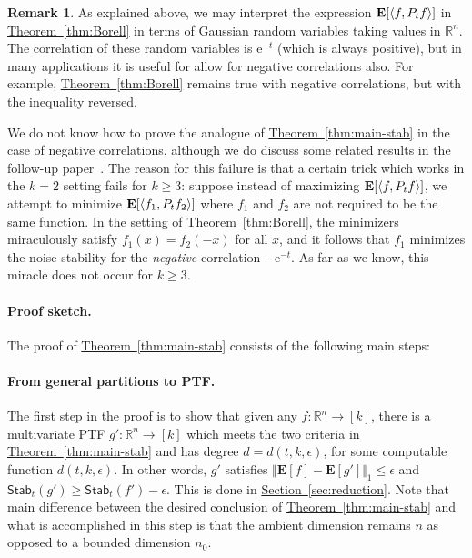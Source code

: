 \documentclass[11pt]{article}
\numberwithin{equation}{section}
\theoremstyle{definition}
\newtheorem{remark}[theorem]{Remark}
\theoremstyle{plain}
\newcommand{\R}{\mathbb R}
\newcommand{\eee}{\mathrm e}
\newcommand{\expref}[2]{\hyperref[#2]{#1~\ref{#2}}}
\newcommand{\E}{{\bf E}}
\begin{document}
\begin{remark}
    As explained above, we may interpret the expression $\E[\langle f, P_t f
      \rangle]$
in  %
    \expref{Theorem}{thm:Borell} in terms of Gaussian random variables
    taking values in $\R^n$. The correlation of these random
    variables is $\eee^{-t}$ (which is always positive), but in many applications
    it is useful for allow for negative correlations also.
    For example, \expref{Theorem}{thm:Borell} remains true with negative
    correlations, but with the inequality reversed.

    We do not know how to prove the analogue of \expref{Theorem}{thm:main-stab} in
    the case of negative correlations, although we do discuss some related
    results in the follow-up paper~\cite{DMN:17b}. The reason for this failure
    is that a certain trick which works in the $k=2$ setting fails for $k\ge3$:
    suppose instead of maximizing $\E[\langle f, P_t f \rangle]$, we attempt to
    minimize $\E[\langle f_1, P_t f_2 \rangle]$ where $f_1$ and $f_2$ are not
    required to be the same function. In the setting of
    \expref{Theorem}{thm:Borell}, the minimizers miraculously satisfy $f_1(x) =
    f_2(-x)$ for all $x$, and it follows that $f_1$ minimizes the noise stability
    for the \emph{negative} correlation $-\eee^{-t}$. As far as we know,
    this miracle does not occur for $k \ge 3$.
\end{remark}

\paragraph{Proof sketch.}
The proof of \expref{Theorem}{thm:main-stab} consists of the following main steps: 

\paragraph{From general partitions to PTF.} 
The first step in the proof is to show that given any $f: \mathbb{R}^n \rightarrow [k]$, there is a multivariate PTF $g': \mathbb{R}^n \rightarrow [k]$ which meets the two criteria in \expref{Theorem}{thm:main-stab} and has degree $d= d(t, k, \epsilon)$, for some computable function $d( t, k ,\epsilon)$.  
In other words, $g'$ satisfies $\Vert \mathbf{E}[f] - \mathbf{E}[g'] \Vert_1 \le \epsilon$ and  $\mathsf{Stab}_t(g') \ge \mathsf{Stab}_t(f')  - \epsilon$. 
 This is done in \expref{Section}{sec:reduction}. Note that main difference between the desired conclusion of \expref{Theorem}{thm:main-stab} and what is accomplished in this step is that the ambient dimension remains $n$ as opposed to a bounded dimension $n_0$. 
 
\end{document}
